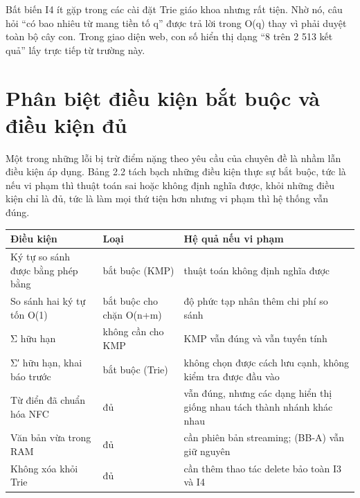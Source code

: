 Bất biến I4 ít gặp trong các cài đặt Trie giáo khoa nhưng rất tiện. Nhờ
nó, câu hỏi ``có bao nhiêu từ mang tiền tố q'' được trả lời trong
O(\textbar q\textbar) thay vì phải duyệt toàn bộ cây con. Trong giao
diện web, con số hiển thị dạng ``8 trên 2 513 kết quả'' lấy trực tiếp từ
trường này.

\section{Phân biệt điều kiện bắt buộc và điều kiện đủ}
\label{sec:2-5}

Một trong những lỗi bị trừ điểm nặng theo yêu cầu của chuyên đề là nhầm
lẫn điều kiện áp dụng. Bảng 2.2 tách bạch những điều kiện thực sự bắt
buộc, tức là nếu vi phạm thì thuật toán sai hoặc không định nghĩa được,
khỏi những điều kiện chỉ là đủ, tức là làm mọi thứ tiện hơn nhưng vi
phạm thì hệ thống vẫn đúng.

\begin{center}
\end{center}

{\footnotesize\singlespacing
\begin{longtable}[]{@{}
  >{\raggedright\arraybackslash}p{}
  >{\raggedright\arraybackslash}p{}
  >{\raggedright\arraybackslash}p{}@{}}
\toprule\noalign{}
\begin{minipage}[b]{\linewidth}\raggedright
Điều kiện
\end{minipage} & \begin{minipage}[b]{\linewidth}\raggedright
Loại
\end{minipage} & \begin{minipage}[b]{\linewidth}\raggedright
Hệ quả nếu vi phạm
\end{minipage} \\
\midrule\noalign{}
\endhead
\bottomrule\noalign{}
\endlastfoot
Ký tự so sánh được bằng phép bằng & bắt buộc (KMP) & thuật toán không
định nghĩa được \\
So sánh hai ký tự tốn O(1) & bắt buộc cho chặn O(n+m) & độ phức tạp nhân
thêm chi phí so sánh \\
Σ hữu hạn & không cần cho KMP & KMP vẫn đúng và vẫn tuyến tính \\
Σ′ hữu hạn, khai báo trước & bắt buộc (Trie) & không chọn được cách lưu
cạnh, không kiểm tra được đầu vào \\
Từ điển đã chuẩn hóa NFC & đủ & vẫn đúng, nhưng các dạng hiển thị giống
nhau tách thành nhánh khác nhau \\
Văn bản vừa trong RAM & đủ & cần phiên bản streaming; (BB-A) vẫn giữ
nguyên \\
Không xóa khỏi Trie & đủ & cần thêm thao tác delete bảo toàn I3 và I4 \\
\end{longtable}
}

